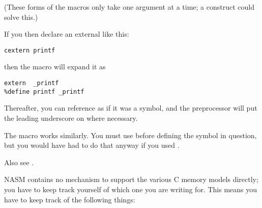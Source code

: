 (These forms of the macros only take one argument at a time; a
 construct could solve this.)

If you then declare an external like this:

\begin{lstlisting}
cextern printf
\end{lstlisting}

then the macro will expand it as

\begin{lstlisting}
extern  _printf
%define printf _printf
\end{lstlisting}

Thereafter, you can reference  as if it was a symbol, and
the preprocessor will put the leading underscore on where necessary.

The  macro works similarly. You must use 
before defining the symbol in question, but you would have had to do
that anyway if you used .

Also see .


NASM contains no mechanism to support the various C memory models
directly; you have to keep track yourself of which one you are
writing for. This means you have to keep track of the following
things:

